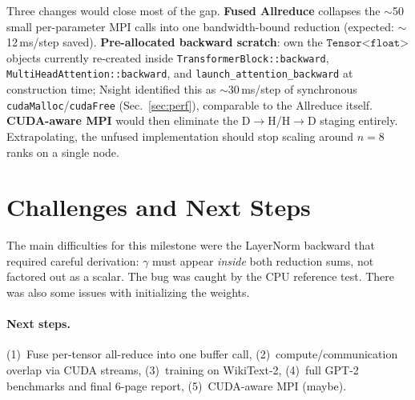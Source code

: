 \documentclass[11pt,letterpaper]{article}
\begin{document}
Three changes would close most of the gap. \textbf{Fused Allreduce} collapses the $\sim$50 small per-parameter MPI calls into one bandwidth-bound reduction (expected: $\sim$12\,ms/step saved). \textbf{Pre-allocated backward scratch}: own the $\texttt{Tensor<float>}$ objects currently re-created inside \texttt{TransformerBlock::backward}, \texttt{MultiHeadAttention::backward}, and \texttt{launch\_attention\_backward} at construction time; Nsight identified this as $\sim$30\,ms/step of synchronous \texttt{cudaMalloc}/\texttt{cudaFree} (Sec.~\ref{sec:perf}), comparable to the Allreduce itself. \textbf{CUDA-aware MPI} would then eliminate the D$\to$H/H$\to$D staging entirely. Extrapolating, the unfused implementation should stop scaling around $n{=}8$ ranks on a single node.

\section{Challenges and Next Steps}

The main difficulties for this milestone were the LayerNorm backward that required careful derivation: $\gamma$ must appear \emph{inside} both reduction
sums, not factored out as a scalar. The bug was caught by the CPU reference test. There was also some issues with initializing the weights.
\paragraph{Next steps.}
(1)~Fuse per-tensor all-reduce into one buffer call,
(2)~compute/communication overlap via CUDA streams,
(3)~training on WikiText-2,
(4)~full GPT-2 benchmarks and final 6-page report,
(5)~CUDA-aware MPI (maybe).
\end{document}
